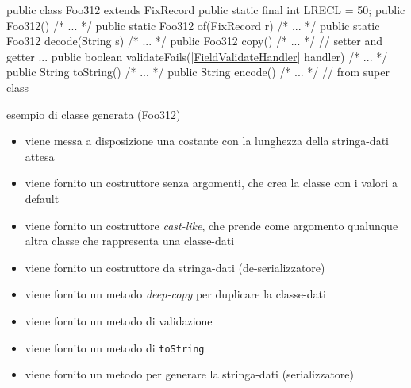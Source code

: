 \documentclass[a4paper,10pt]{report}
\newif\ifesource
\newenvironment{elisting}[1][H]
  {\captionsetup{aboveskip=0pt}\begin{listing}[#1]}
  {\end{listing}%
}
\begin{document}
\ifesource
\begin{figure*}[!htb]
\begin{lstlisting}[language=java, caption=esempio di classe generata (Foo312), 
label=lst:Foo312:java]
public class Foo312 extends FixRecord {
    public static final int LRECL = 50;
    public Foo312() { /* ... */ }
    public static Foo312 of(FixRecord r) { /* ... */ }
    public static Foo312 decode(String s) { /* ... */ }
    public Foo312 copy() { /* ... */ }
    // setter and getter ...
    public boolean validateFails((*\hyperref[lst:FieldValidateHandler:java]{FieldValidateHandler}*) handler) { /* ... */ }
    public String toString() { /* ... */ }
    public String encode() { /* ... */ }    // from super class
}
\end{lstlisting}
\end{figure*}
\else
\begin{elisting}[!htb]
\begin{javacode}
public class Foo312 extends FixRecord {
    public static final int LRECL = 50;
    public Foo312() { /* ... */ }
    public static Foo312 of(FixRecord r) { /* ... */ }
    public static Foo312 decode(String s) { /* ... */ }
    public Foo312 copy() { /* ... */ }
    // setter and getter ...
    public boolean validateFails(|\hyperref[lst:FieldValidateHandler:java]{FieldValidateHandler}| handler) { /* ... */ }
    public String toString() { /* ... */ }
    public String encode() { /* ... */ }    // from super class
}
\end{javacode}
\caption{esempio di classe generata (Foo312)}
\label{lst:Foo312:java}
\end{elisting}
\fi

\begin{itemize}
\item viene messa a disposizione una costante con la lunghezza della 
    stringa-dati attesa
\item viene fornito un costruttore senza argomenti, che crea la classe con i 
    valori a default
\item viene fornito un costruttore \textit{cast-like}, che prende come argomento
    qualunque altra classe che rappresenta una classe-dati
\item viene fornito un costruttore da stringa-dati (de-serializzatore)
\item viene fornito un metodo \textit{deep-copy} per duplicare la classe-dati
\item viene fornito un metodo di validazione
\item viene fornito un metodo di \texttt{toString}
\item viene fornito un metodo per generare la stringa-dati (serializzatore)
\end{itemize}
\end{document}
